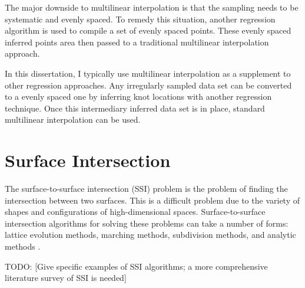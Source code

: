 The major downside to multilinear interpolation is that the sampling needs to be systematic and evenly spaced.
To remedy this situation, another regression algorithm is used to compile a set of evenly spaced points.
These evenly spaced inferred points area then passed to a traditional multilinear interpolation approach.

In this dissertation, I typically use multilinear interpolation as a supplement to  other regression approaches.
Any irregularly sampled data set can be converted to a evenly spaced one by inferring knot locations with another regression technique.
Once this intermediary inferred data set is in place, standard multilinear interpolation can be used.




\section{Surface Intersection}
The surface-to-surface intersection (SSI) problem is the problem of finding the intersection between two surfaces.
This is a difficult problem due to the variety of shapes and configurations of high-dimensional spaces.
Surface-to-surface intersection algorithms for solving these problems can take a number of forms:
lattice evolution methods, marching methods, subdivision methods, and analytic methods \cite{patrikalakis1993surface}.

TODO: [Give specific examples of SSI algorithms; a more comprehensive literature survey of SSI is needed] \cite{huber}


